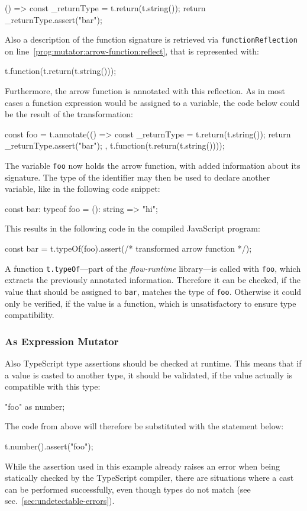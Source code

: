 \begin{JsCode}[numbers=none]
() => {
  const _returnType = t.return(t.string());
  return _returnType.assert("bar");
}
\end{JsCode}
Also a description of the function signature is retrieved via \texttt{functionReflection} on line~\ref{prog:mutator:arrow-function:reflect}, that is represented with:
\begin{JsCode}[numbers=none]
t.function(t.return(t.string()));
\end{JsCode}
Furthermore, the arrow function is annotated with this reflection. As in most cases a function expression would be assigned to a variable, the code below could be the result of the transformation:
\begin{JsCode}[numbers=none]
const foo = t.annotate(() => {
  const _returnType = t.return(t.string());
  return _returnType.assert("bar");
}, t.function(t.return(t.string())));
\end{JsCode}
The variable \texttt{foo} now holds the arrow function, with added information about its signature. The type of the identifier may then be used to declare another variable, like in the following code snippet:
\begin{JsCode}[numbers=none]
const bar: typeof foo = (): string => "hi";
\end{JsCode}
This results in the following code in the compiled JavaScript program:
\begin{JsCode}[numbers=none]
const bar = t.typeOf(foo).assert(/* transformed arrow function */);
\end{JsCode}
A function \texttt{t.typeOf}---part of the \emph{flow-runtime} library---is called with \texttt{foo}, which extracts the previously annotated information. Therefore it can be checked, if the value that should be assigned to \texttt{bar}, matches the type of \texttt{foo}. Otherwise it could only be verified, if the value is a function, which is unsatisfactory to ensure type compatibility.

\subsubsection{As Expression Mutator}

Also TypeScript type assertions should be checked at runtime. This means that if a value is casted to another type, it should be validated, if the value actually is compatible with this type:
\begin{JsCode}[numbers=none]
"foo" as number;
\end{JsCode}
The code from above will therefore be substituted with the statement below:
\begin{JsCode}[numbers=none]
t.number().assert("foo");
\end{JsCode}
While the assertion used in this example already raises an error when being statically checked by the TypeScript compiler, there are situations where a cast can be performed successfully, even though types do not match (see sec.~\ref{sec:undetectable-errors}).

